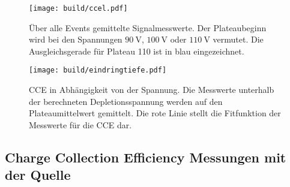 \begin{figure}
  \centering
  \texttt{[image: build/ccel.pdf]}
  \caption{Über alle Events gemittelte Signalmesswerte. Der Plateaubeginn wird bei den Spannungen $\SI{90}{\volt}$, $\SI{100}{\volt}$ oder $\SI{110}{\volt}$ vermutet.
  Die Ausgleichsgerade für Plateau 110 ist in blau eingezeichnet.}
  \label{fig:ccel}
\end{figure}

\begin{figure}
  \centering
  \texttt{[image: build/eindringtiefe.pdf]}
  \caption{CCE in Abhängigkeit von der Spannung. Die Messwerte unterhalb der berechneten Depletionsspannung werden auf den Plateaumittelwert gemittelt. Die rote Linie stellt die Fitfunktion der Messwerte für die CCE dar.}
  \label{fig:eindringtiefe}
\end{figure}

\subsection{Charge Collection Efficiency Messungen mit der Quelle}
\label{sec:cceq}

